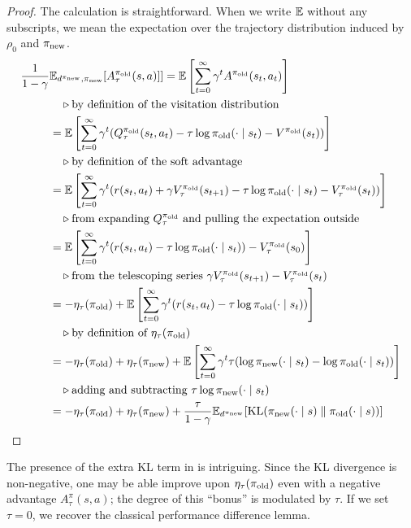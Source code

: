 \documentclass[\main/thesis.tex]{subfiles}
\begin{document}
\begin{proof}
%
The calculation is straightforward. When we write $\mathbb{E}$ without any subscripts, we mean the expectation over the trajectory distribution induced by $\rho_0$ and ${\pi_\mathrm{new}}$.
\begin{align*}
    \frac{1}{1 - \gamma}&\mathbb{E}_{d^{{\pi_\mathrm{new}}},{\pi_\mathrm{new}}}[A^{{\pi_\mathrm{old}}}_\tau(s, a)]] = \mathbb{E}\left[\sum_{t = 0}^\infty \gamma^t A^{{\pi_\mathrm{old}}}(s_t, a_t)\right]\\
    &\quad \triangleright \text{by definition of the visitation distribution}\\
    &= \mathbb{E}\left[\sum_{t = 0}^\infty \gamma^t (Q^{\pi_\mathrm{old}}_\tau(s_t, a_t) - \tau \log {\pi_\mathrm{old}}(\cdot \mid s_t) - V^{{\pi_\mathrm{old}}}(s_t))\right]\\
    &\quad \triangleright \text{by definition of the soft advantage}\\
        &= \mathbb{E}\left[\sum_{t = 0}^\infty \gamma^t (r(s_t, a_t) + \gamma V_\tau^{{\pi_\mathrm{old}}}(s_{t + 1}) - \tau \log {\pi_\mathrm{old}}(\cdot \mid s_t) - V^{{\pi_\mathrm{old}}}_\tau(s_t))\right]\\
        &\quad \triangleright \text{from expanding } Q^{\pi_\mathrm{old}}_\tau \text{ and pulling the expectation outside}\\
        &= \mathbb{E}\left[\sum_{t = 0}^\infty \gamma^t (r(s_t, a_t) - \tau \log {\pi_\mathrm{old}}(\cdot \mid s_t)) - V_\tau^{{\pi_\mathrm{old}}}(s_0)\right]\\
        &\quad \triangleright \text{from the telescoping series } \gamma V^{\pi_\mathrm{old}}_\tau(s_{t + 1}) - V^{\pi_\mathrm{old}}_\tau(s_t)\\
        &= -\eta_\tau({\pi_\mathrm{old}}) + \mathbb{E}\left[\sum_{t = 0}^\infty \gamma^t (r(s_t, a_t) - \tau \log  {\pi_\mathrm{old}}(\cdot \mid s_t)) \right]\\
        &\quad \triangleright \text{by definition of } \eta_\tau({\pi_\mathrm{old}})\\
        &= -\eta_\tau({\pi_\mathrm{old}}) + \eta_\tau({\pi_\mathrm{new}}) + \mathbb{E}\left[\sum_{t = 0}^\infty \gamma^t \tau (\log {\pi_\mathrm{new}}(\cdot \mid s_t) -  \log  {\pi_\mathrm{old}}( \cdot \mid s_t)) \right] \\
        &\quad \triangleright \text{adding and subtracting } \tau \log {\pi_\mathrm{new}}(\cdot \mid s_t)\\
        &= -\eta_\tau({\pi_\mathrm{old}}) + \eta_\tau({\pi_\mathrm{new}})  + \frac{\tau}{1 - \gamma} \mathbb{E}_{d^{{\pi_\mathrm{new}}}}[\mathrm{KL}({\pi_\mathrm{new}}(\cdot \mid s) \parallel {\pi_\mathrm{old}}(\cdot \mid s))]
\end{align*}
\end{proof}
The presence of the extra KL term in  is intriguing. Since the KL divergence is non-negative, one may be able improve upon $\eta_\tau({\pi_\mathrm{old}})$ even with a negative advantage $A^\pi_\tau(s, a)$; the degree of this ``bonus'' is modulated by $\tau$. If we set $\tau = 0$, we recover the classical performance difference lemma. 
\end{document}
